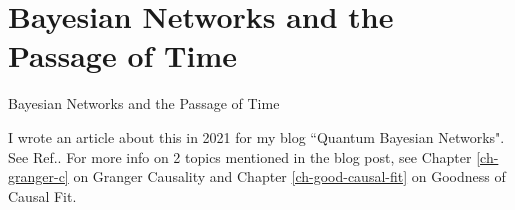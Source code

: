 \chapter*{Bayesian Networks and the 
Passage of Time}
{Bayesian Networks and the 
Passage of Time}

\label{ch-passage-time}

I wrote an article about
this in 2021 for
my blog ``Quantum Bayesian Networks". 
See Ref.\cite{bnets-passage-time}.
For more info
on 2 topics mentioned in the blog post,
see Chapter \ref{ch-granger-c} on 
Granger Causality and Chapter 
\ref{ch-good-causal-fit} on Goodness of Causal Fit.
